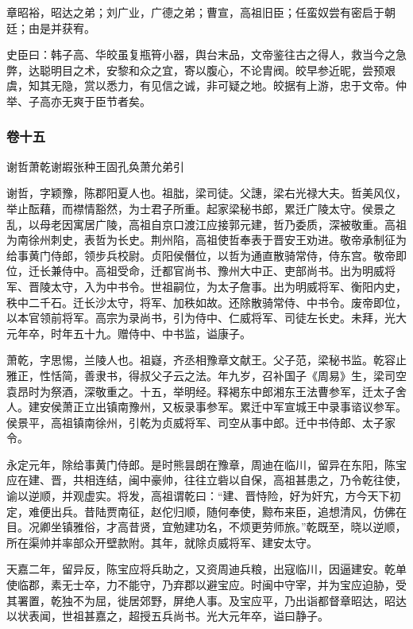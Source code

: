 \documentclass[]{article}
\begin{document}
章昭裕，昭达之弟；刘广业，广德之弟；曹宣，高祖旧臣；任蛮奴尝有密启于朝廷；由是并获宥。

史臣曰：韩子高、华皎虽复瓶筲小器，舆台末品，文帝鉴往古之得人，救当今之急弊，达聪明目之术，安黎和众之宜，寄以腹心，不论胄阀。皎早参近昵，尝预艰虞，知其无隐，赏以悉力，有见信之诚，非可疑之地。皎据有上游，忠于文帝。仲举、子高亦无爽于臣节者矣。

\hypertarget{header-n4640}{%
\subsubsection{卷十五}\label{header-n4640}}

谢哲萧乾谢嘏张种王固孔奂萧允弟引

谢哲，字颖豫，陈郡阳夏人也。祖朏，梁司徒。父譓，梁右光禄大夫。哲美风仪，举止酝藉，而襟情豁然，为士君子所重。起家梁秘书郎，累迁广陵太守。侯景之乱，以母老因寓居广陵，高祖自京口渡江应接郭元建，哲乃委质，深被敬重。高祖为南徐州刺史，表哲为长史。荆州陷，高祖使哲奉表于晋安王劝进。敬帝承制征为给事黄门侍郎，领步兵校尉。贞阳侯僭位，以哲为通直散骑常侍，侍东宫。敬帝即位，迁长兼侍中。高祖受命，迁都官尚书、豫州大中正、吏部尚书。出为明威将军、晋陵太守，入为中书令。世祖嗣位，为太子詹事。出为明威将军、衡阳内史，秩中二千石。迁长沙太守，将军、加秩如故。还除散骑常侍、中书令。废帝即位，以本官领前将军。高宗为录尚书，引为侍中、仁威将军、司徒左长史。未拜，光大元年卒，时年五十九。赠侍中、中书监，谥康子。

萧乾，字思惕，兰陵人也。祖嶷，齐丞相豫章文献王。父子范，梁秘书监。乾容止雅正，性恬简，善隶书，得叔父子云之法。年九岁，召补国子《周易》生，梁司空袁昂时为祭酒，深敬重之。十五，举明经。释褐东中郎湘东王法曹参军，迁太子舍人。建安侯萧正立出镇南豫州，又板录事参军。累迁中军宣城王中录事谘议参军。侯景平，高祖镇南徐州，引乾为贞威将军、司空从事中郎。迁中书侍郎、太子家令。

永定元年，除给事黄门侍郎。是时熊昙朗在豫章，周迪在临川，留异在东阳，陈宝应在建、晋，共相连结，闽中豪帅，往往立砦以自保，高祖甚患之，乃令乾往使，谕以逆顺，并观虚实。将发，高祖谓乾曰：``建、晋恃险，好为奸宄，方今天下初定，难便出兵。昔陆贾南征，赵佗归顺，随何奉使，黥布来臣，追想清风，仿佛在目。况卿坐镇雅俗，才高昔贤，宜勉建功名，不烦更劳师旅。''乾既至，晓以逆顺，所在渠帅并率部众开壁款附。其年，就除贞威将军、建安太守。

天嘉二年，留异反，陈宝应将兵助之，又资周迪兵粮，出寇临川，因逼建安。乾单使临郡，素无士卒，力不能守，乃弃郡以避宝应。时闽中守宰，并为宝应迫胁，受其署置，乾独不为屈，徙居郊野，屏绝人事。及宝应平，乃出诣都督章昭达，昭达以状表闻，世祖甚嘉之，超授五兵尚书。光大元年卒，谥曰静子。
\end{document}
